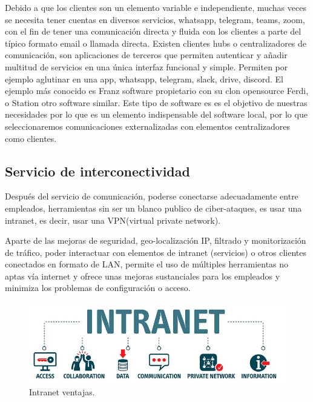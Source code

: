 Debido a que los clientes son un elemento variable e independiente, muchas veces se necesita tener cuentas en diversos servicios, whatsapp, telegram, teams, zoom, con el fin de tener una comunicación directa y fluida con los clientes a parte del típico formato email o llamada directa. Existen clientes hubs o centralizadores de comunicación, son aplicaciones de terceros que permiten autenticar y añadir multitud de servicios en una única interfaz funcional y simple. Permiten por ejemplo aglutinar en una app, whatsapp, telegram, slack, drive, discord. El ejemplo más conocido es Franz\cite{c_franz} software propietario con su clon opensource Ferdi\cite{c_ferdi}, o Station\cite{c_station} otro software similar. Este tipo de software es es el objetivo de nuestras necesidades por lo que es un elemento indispensable del software local, por lo que seleccionaremos comunicaciones externalizadas con elementos centralizadores como clientes.

\subsection{Servicio de interconectividad}

Después del servicio de comunicación, poderse conectarse adecuadamente entre empleados, herramientas sin ser un blanco publico de ciber-ataques, es usar una intranet, es decir, usar una VPN(virtual private network).

 Aparte de las mejoras de seguridad, geo-localización IP, filtrado y monitorización de tráfico, poder interactuar con elementos de intranet (servicios) o otros clientes conectados en formato de LAN, permite el uso de múltiples herramientas no aptas vía internet y ofrece unas mejoras sustanciales para los empleados y minimiza los problemas de configuración o acceso. 

\begin{figure}[!htb]
\begin{center}
\includegraphics[width=1\textwidth]{./figuras/intranet.jpg}
\caption{Intranet ventajas.\cite{c_intranet}}
\label{F:intranet}
\end{center}
\end{figure}
 
